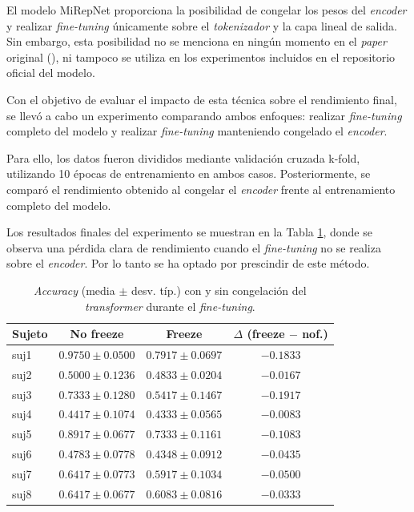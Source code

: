 El modelo MiRepNet proporciona la posibilidad de congelar los pesos del \textit{encoder} y realizar \textit{fine-tuning} únicamente sobre el \textit{tokenizador} y la capa lineal de salida. Sin embargo, esta posibilidad no se menciona en ningún momento en el \textit{paper} original (\cite{liu2025mirepnetpipelinefoundationmodel}), ni tampoco se utiliza en los experimentos incluidos en el repositorio oficial del modelo.

Con el objetivo de evaluar el impacto de esta técnica sobre el rendimiento final, se llevó a cabo un experimento comparando ambos enfoques: realizar \textit{fine-tuning} completo del modelo y realizar \textit{fine-tuning} manteniendo congelado el \textit{encoder}.

Para ello, los datos fueron divididos mediante validación cruzada k-fold, utilizando 10 épocas de entrenamiento en ambos casos. Posteriormente, se comparó el rendimiento obtenido al congelar el \textit{encoder} frente al entrenamiento completo del modelo.

Los resultados finales del experimento se muestran en la Tabla \ref{tab:freezeComparison}, donde se observa una pérdida clara de rendimiento cuando el \textit{fine-tuning} no se realiza sobre el \textit{encoder}. Por lo tanto se ha optado por prescindir de este método. 

\begin{table}[h]
	\centering
	\begin{tabular}{lccc}
		\hline
		\textbf{Sujeto} & \textbf{No freeze} & \textbf{Freeze} & \textbf{$\Delta$ (freeze $-$ nof.)} \\
		\hline
		suj1 & $0.9750 \pm 0.0500$ & $0.7917 \pm 0.0697$ & $-0.1833$ \\
		suj2 & $0.5000 \pm 0.1236$ & $0.4833 \pm 0.0204$ & $-0.0167$ \\
		suj3 & $0.7333 \pm 0.1280$ & $0.5417 \pm 0.1467$ & $-0.1917$ \\
		suj4 & $0.4417 \pm 0.1074$ & $0.4333 \pm 0.0565$ & $-0.0083$ \\
		suj5 & $0.8917 \pm 0.0677$ & $0.7333 \pm 0.1161$ & $-0.1083$ \\
		suj6 & $0.4783 \pm 0.0778$ & $0.4348 \pm 0.0912$ & $-0.0435$ \\
		suj7 & $0.6417 \pm 0.0773$ & $0.5917 \pm 0.1034$ & $-0.0500$ \\
		suj8 & $0.6417 \pm 0.0677$ & $0.6083 \pm 0.0816$ & $-0.0333$ \\
		\hline
	\end{tabular}
	\caption{\textit{Accuracy} (media $\pm$ desv. típ.) con y sin congelación del \textit{transformer} durante el \textit{fine-tuning}.}
	\label{tab:freezeComparison}
\end{table}

